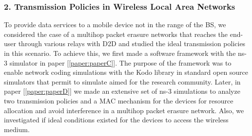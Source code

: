 \subsubsection{2. Transmission Policies in Wireless Local Area Networks}

To provide data services to a mobile device not in the range of the \ac{BS}, we considered the case of a multihop packet erasure networks that reaches the end-user through various relays with \ac{D2D} and studied the ideal transmission policies in this scenario. To achieve this, we first made a software framework with the ns-3 simulator \cite{kodons3link,kodons3tutorial} in paper {[\ref{paper:paperC}]}. The purpose of the framework was to enable network coding simulations with the Kodo library in standard open source simulators that permit to simulate aimed for the research community. Later, in paper {[\ref{paper:paperD}]} we made an extensive set of ns-3 simulations to analyze two transmission policies and a \ac{MAC} mechanism for the devices for resource allocation and avoid interference in a multihop packet erasure network. Also, we investigated if ideal conditions existed for the devices to access the wireless medium.

\clearpage